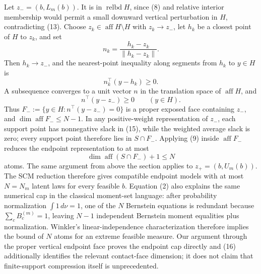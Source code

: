 Let \(z_-=(b,L_m(b))\).  It is in \(\operatorname{relbd}H\), since (8) and relative interior membership would permit a small downward vertical perturbation in \(H\), contradicting (13).  Choose \(z_k\in\operatorname{aff}H\setminus H\) with \(z_k\to z_-\), let \(h_k\) be a closest point of \(H\) to \(z_k\), and set
\[
 n_k=\frac{h_k-z_k}{\lVert h_k-z_k\rVert}.
\]
Then \(h_k\to z_-\), and the nearest-point inequality along segments from \(h_k\) to \(y\in H\) is
\[
 n_k^{\top}(y-h_k)\geq0.
\tag{14}
\]
A subsequence converges to a unit vector \(n\) in the translation space of \(\operatorname{aff}H\), and
\[
 n^{\top}(y-z_-)\geq0\qquad(y\in H).
\tag{15}
\]
Thus \(F_-:=\{y\in H:n^{\top}(y-z_-)=0\}\) is a proper exposed face containing \(z_-\), and \(\dim\operatorname{aff}F_-\leq N-1\).  In any positive-weight representation of \(z_-\), each support point has nonnegative slack in (15), while the weighted average slack is zero; every support point therefore lies in \(S\cap F_-\).  Applying (9) inside \(\operatorname{aff}F_-\) reduces the endpoint representation to at most
\[
 \dim\operatorname{aff}(S\cap F_-)+1\leq N
\tag{16}
\]
atoms.  The same argument from above the section applies to \(z_+=(b,U_m(b))\).  The SCM reduction therefore gives compatible endpoint models with at most \(N=N_m\) latent laws for every feasible \(b\).  Equation (2) also explains the same numerical cap in the classical moment-set language: after probability normalization \(\int 1\,d\nu=1\), one of the \(N\) Bernstein equations is redundant because \(\sum_cB_c^{(m)}=1\), leaving \(N-1\) independent Bernstein moment equalities plus normalization.  Winkler's linear-independence characterization therefore implies the bound of \(N\) atoms for an extreme feasible measure.  Our argument through the proper vertical endpoint face proves the endpoint cap directly and (16) additionally identifies the relevant contact-face dimension; it does not claim that finite-support compression itself is unprecedented.

